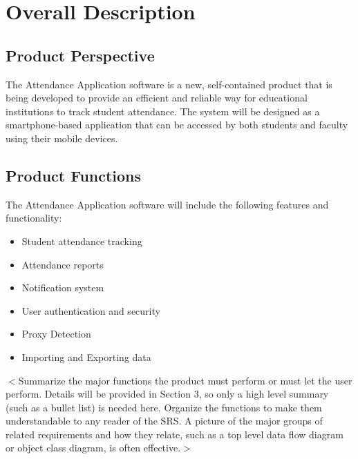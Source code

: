 \documentclass{scrreprt}
\begin{document}
\chapter{Overall Description}

\section{Product Perspective}
The Attendance Application software is a new, self-contained product that is being developed to provide an efficient and reliable way for educational institutions to track student attendance. The system will be designed as a smartphone-based application that can be accessed by both students and faculty using their mobile devices.


\section{Product Functions}
The Attendance Application software will include the following features and functionality:
\begin{multicols}{2}
    \begin{itemize}
        \item Student attendance tracking
        \vspace{-4pt}
        \item Attendance reports
        \vspace{-4pt}
        \item Notification system
        \vspace{-4pt}
        \item User authentication and security
        \vspace{-4pt}
        \item Proxy Detection
        \vspace{-4pt}
        \item Importing and Exporting data
    \end{itemize}
\end{multicols}

$<$Summarize the major functions the product must perform or must let the user 
perform. Details will be provided in Section 3, so only a high level summary 
(such as a bullet list) is needed here. Organize the functions to make them 
understandable to any reader of the SRS. A picture of the major groups of 
related requirements and how they relate, such as a top level data flow diagram 
or object class diagram, is often effective.$>$
\end{document}
